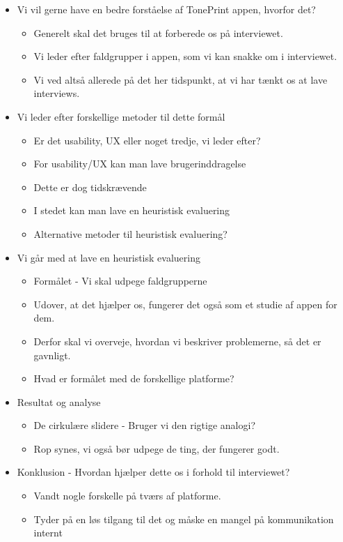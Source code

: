 \begin{itemize}
	\item Vi vil gerne have en bedre forståelse af TonePrint appen, hvorfor det?
	\begin{itemize}
		\item Generelt skal det bruges til at forberede os på interviewet.
		\item Vi leder efter faldgrupper i appen, som vi kan snakke om i interviewet.
		\item Vi ved altså allerede på det her tidspunkt, at vi har tænkt os at lave interviews.
	\end{itemize}
	\item Vi leder efter forskellige metoder til dette formål
	\begin{itemize}
		\item Er det usability, UX eller noget tredje, vi leder efter?
		\item For usability/UX kan man lave brugerinddragelse
		\item Dette er dog tidskrævende
		\item I stedet kan man lave en heuristisk evaluering
		\item Alternative metoder til heuristisk evaluering?
	\end{itemize}
	\item Vi går med at lave en heuristisk evaluering
	\begin{itemize}
		\item Formålet - Vi skal udpege faldgrupperne
		\item Udover, at det hjælper os, fungerer det også som et studie af appen for dem.
		\item Derfor skal vi overveje, hvordan vi beskriver problemerne, så det er gavnligt.
		\item Hvad er formålet med de forskellige platforme?
	\end{itemize}
	\item Resultat og analyse
	\begin{itemize}
		\item De cirkulære slidere - Bruger vi den rigtige analogi?
		\item Rop synes, vi også bør udpege de ting, der fungerer godt.
	\end{itemize}
	\item Konklusion - Hvordan hjælper dette os i forhold til interviewet?
	\begin{itemize}
		\item Vandt nogle forskelle på tværs af platforme.
		\item Tyder på en løs tilgang til det og måske en mangel på kommunikation internt
	\end{itemize}
\end{itemize}

